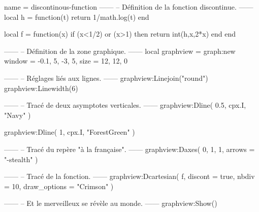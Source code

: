 \documentclass{standalone}
\begin{document}
\begin{luadraw}{name = discontinous-function}
------
-- Définition de la fonction discontinue.
------
local h = function(t)
  return 1/math.log(t)
end

local f = function(x)
  if (x<1/2) or (x>1) then
    return int(h,x,2*x)
  end
end

------
-- Définition de la zone graphique.
------
local graphview = graph:new{
  window = {-0.1, 5, -3, 5},
  size   = {12, 12, 0}
}

------
-- Réglages liés aux lignes.
------
graphview:Linejoin("round")
graphview:Linewidth(6)

------
-- Tracé de deux asymptotes verticales.
------
graphview:Dline(
  {0.5, cpx.I},
  "Navy"
)

graphview:Dline(
  {1, cpx.I},
  "ForestGreen"
)

------
-- Tracé du repère "à la française".
------
graphview:Daxes(
  {0, 1, 1},
  {
    arrows = "-stealth"
  })

------
-- Tracé de la fonction.
------
graphview:Dcartesian(
  f,
  {
    discont      = true,
    nbdiv        = 10,
    draw_options = "Crimson"
  })

------
-- Et le merveilleux se révèle au monde.
------
graphview:Show()
\end{luadraw}
\end{document}
